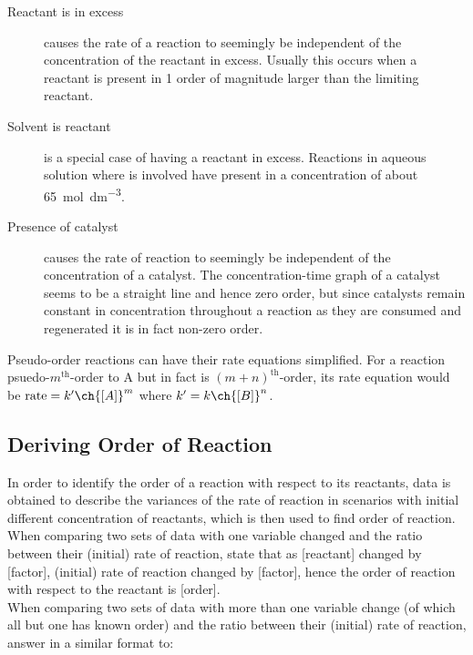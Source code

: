 \documentclass[../main]{subfiles}
\begin{document}
	\begin{description}
		\item[Reactant is in excess] causes the rate of a reaction to seemingly be independent of the concentration of the reactant in excess. Usually this occurs when a reactant is present in 1 order of magnitude larger than the limiting reactant.
		\item[Solvent is reactant] is a special case of having a reactant in excess. Reactions in aqueous solution where  is involved have  present in a concentration of about \SI{65}{\mol\per\dm\cubed}.
		\item[Presence of catalyst] causes the rate of reaction to seemingly be independent of the concentration of a catalyst. The concentration-time graph of a catalyst seems to be a straight line and hence zero order, but since catalysts remain constant in concentration throughout a reaction as they are consumed and regenerated it is in fact non-zero order.
	\end{description}

	Pseudo-order reactions can have their rate equations simplified. For a reaction psuedo-\(m^\text{th}\)-order to A but in fact is \((m+n)^\text{th}\)-order, its rate equation would be \(\text{rate} = k' \ch{[A]}^m\) where \( k' = k \ch{[B]}^n \).

	\subsection{Deriving Order of Reaction}

	In order to identify the order of a reaction with respect to its reactants, data is obtained to describe the variances of the rate of reaction in scenarios with initial different concentration of reactants, which is then used to find order of reaction. \\

	When comparing two sets of data with one variable changed and the ratio between their (initial) rate of reaction, state that as [reactant] changed by [factor], (initial) rate of reaction changed by [factor], hence the order of reaction with respect to the reactant is [order]. \\

	When comparing two sets of data with more than one variable change (of which all but one has known order) and the ratio between their (initial) rate of reaction, answer in a similar format to:

\end{document}
